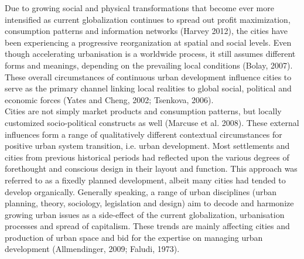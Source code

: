 \documentclass[11pt]{report}
\begin{document}
Due to growing social and physical transformations that become ever more intensified as current globalization continues to spread out profit maximization, consumption patterns and information networks (Harvey 2012), the cities have been experiencing a progressive reorganization at spatial and social levels. Even though accelerating urbanisation is a worldwide process, it still assumes different forms and meanings, depending on the prevailing local conditions (Bolay, 2007). These overall circumstances of continuous urban development influence cities to serve as the primary channel linking local realities to global social, political and economic forces (Yates and Cheng, 2002; Tsenkova, 2006).
\\
Cities are not simply market products and consumption patterns, but locally customized socio-political constructs as well (Marcuse et al. 2008). These external influences form a range of qualitatively different contextual circumstances for positive urban system transition, i.e. urban development. Most settlements and cities from previous historical periods had reflected upon the various degrees of forethought and conscious design in their layout and function. This approach was referred to as a fixedly planned development, albeit many cities had tended to develop organically. Generally speaking, a range of urban disciplines (urban planning, theory, sociology, legislation and design) aim to decode and harmonize growing urban issues as a side-effect of the current globalization, urbanisation processes and spread of capitalism. These trends are mainly affecting cities and production of urban space and bid for the expertise on managing urban development (Allmendinger, 2009; Faludi, 1973). 
\\
\end{document}
